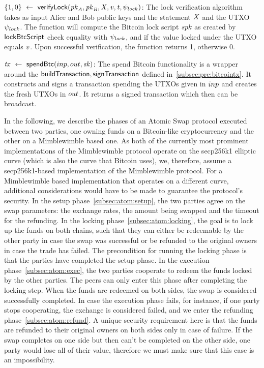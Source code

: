 \begin{asparaitem}
    \item $\{ 1,0 \} ~\leftarrow~ \mathsf{verifyLock} (\mathit{pk}_{\mathit{A}},\mathit{pk}_{\mathit{B}},\mathit{X},\mathit{v},\mathit{t},\psi_{lock})$:
    The lock verification algorithm takes as input Alice and Bob public keys and the statement $\mathit{X}$ and the UTXO $\psi_{lock}$.
    The function will compute the Bitcoin lock script $\mathit{spk}$ as created by $\mathsf{lockBtcScript}$ check equality with $\psi_{lock}$, and if the value locked under the UTXO equals $\mathit{v}$.
    Upon successful verification, the function returns 1, otherwise 0.
    \item $\mathit{tx} ~\leftarrow~ \mathsf{spendBtc}(inp,out,\mathit{sk})$:
    The spend Bitcoin functionality is a wrapper around the $\mathsf{buildTransaction}, \mathsf{signTransaction}$ defined in~\cref{subsec:pre:bitcointx}.
    It constructs and signs a transaction spending the UTXOs given in $inp$ and creates the fresh UTXOs in $out$.
    It returns a signed transaction which then can be broadcast.
\end{asparaitem}


In the following, we describe the phases of an Atomic Swap protocol executed between two parties, one owning funds on a Bitcoin-like cryptocurrency and the other on a Mimblewimble based one.
As both of the currently most prominent implementations of the Mimblewimble protocol operate on the secp256k1 elliptic curve (which is also the curve that Bitcoin uses), we, therefore, assume a secp256k1-based implementation of the Mimblewimble protocol.
For a Mimblewimble based implementation that operates on a different curve, additional considerations would have to be made to guarantee the protocol's security.
In the setup phase~\cref{subsec:atom:setup}, the two parties agree on the swap parameters: the exchange rates, the amount being swapped and the timeout for the refunding.
In the locking phase~\cref{subsec:atom:locking}, the goal is to lock up the funds on both chains, such that they can either be redeemable by the other party in case the swap was successful or be refunded to the original owners in case the trade has failed.
The precondition for running the locking phase is that the parties have completed the setup phase.
In the execution phase~\cref{subsec:atom:exec}, the two parties cooperate to redeem the funds locked by the other parties.
The peers can only enter this phase after completing the locking step.
When the funds are redeemed on both sides, the swap is considered successfully completed.
In case the execution phase fails, for instance, if one party stops cooperating, the exchange is considered failed, and we enter the refunding phase~\cref{subsec:atom:refund}.
A unique security requirement here is that the funds are refunded to their original owners on both sides only in case of failure.
If the swap completes on one side but then can't be completed on the other side, one party would lose all of their value, therefore we must make sure that this case is an impossibility.

